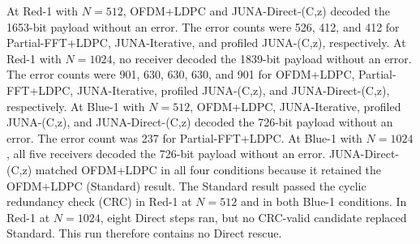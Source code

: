 At Red-1 with $N=512$, OFDM+LDPC and JUNA-Direct-(C,z) decoded the 1653-bit payload without an error.
The error counts were 526, 412, and 412 for Partial-FFT+LDPC, JUNA-Iterative, and profiled JUNA-(C,z), respectively.
At Red-1 with $N=1024$, no receiver decoded the 1839-bit payload without an error.
The error counts were 901, 630, 630, 630, and 901 for OFDM+LDPC, Partial-FFT+LDPC, JUNA-Iterative, profiled JUNA-(C,z), and JUNA-Direct-(C,z), respectively.
At Blue-1 with $N=512$, OFDM+LDPC, JUNA-Iterative, profiled JUNA-(C,z), and JUNA-Direct-(C,z) decoded the 726-bit payload without an error.
The error count was 237 for Partial-FFT+LDPC.
At Blue-1 with $N=1024$, all five receivers decoded the 726-bit payload without an error.
JUNA-Direct-(C,z) matched OFDM+LDPC in all four conditions because it retained the OFDM+LDPC (Standard) result.
The Standard result passed the cyclic redundancy check (CRC) in Red-1 at $N=512$ and in both Blue-1 conditions.
In Red-1 at $N=1024$, eight Direct steps ran, but no CRC-valid candidate replaced Standard.
This run therefore contains no Direct rescue.
